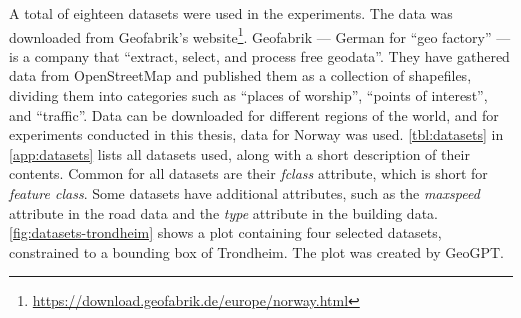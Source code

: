 \begin{comment}
        \midrule
        Outdoor Recreation Areas                  & The purpose of the dataset is to provide an overview of areas that are important for the public's outdoor life, and it should be easy to account for which assessments and criteria have been the basis for the work and the final product.                                                       \\
        \midrule
        Cultural Monuments - Protected Buildings  & Buildings and churches that are automatically, decision, regulation, or temporarily protected under law and churches that have the status as listed.                                                                                                                                              \\
        \midrule
        Flood Zones                               & Flood zones show areas that are flooded by different flood sizes (recurrence interval). Flood zones are prepared for 20-, 200-, and 1000-year floods.                                                                                                                                             \\
        \midrule
        Quick Clay Zones                          & Provides an overview of zones with potential danger (precautionary areas) for major quick clay landslides.                                                                                                                                                                                        \\
        \bottomrule
    \end{tabularx}
\end{table}

\end{comment}

A total of eighteen datasets were used in the experiments. The data was downloaded from Geofabrik's website\footnote{\url{https://download.geofabrik.de/europe/norway.html}}. Geofabrik --- German for \enquote{geo factory} --- is a company that \enquote{extract, select, and process free geodata}. They have gathered data from OpenStreetMap and published them as a collection of shapefiles, dividing them into categories such as \enquote{places of worship}, \enquote{points of interest}, and \enquote{traffic}. Data can be downloaded for different regions of the world, and for experiments conducted in this thesis, data for Norway was used. \autoref{tbl:datasets} in \autoref{app:datasets} lists all datasets used, along with a short description of their contents. Common for all datasets are their \emph{fclass} attribute, which is short for \emph{feature class}. Some datasets have additional attributes, such as the \emph{maxspeed} attribute in the road data and the \emph{type} attribute in the building data. \autoref{fig:datasets-trondheim} shows a plot containing four selected datasets, constrained to a bounding box of Trondheim. The plot was created by GeoGPT.

